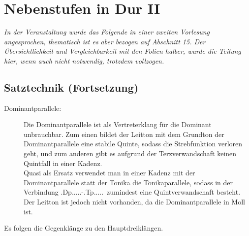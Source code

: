 \documentclass[a4paper]{article}
\newcommand{\Tp}{\HH.Tp.....}
\newcommand{\Dp}{\HH.Dp.....}
\begin{document}
	\section{Nebenstufen in Dur II}
	\textit{In der Veranstaltung wurde das Folgende in einer zweiten Vorlesung angesprochen, thematisch ist es aber bezogen auf Abschnitt 15. Der Übersichtlichkeit und Vergleichbarkeit mit den Folien halber, wurde die Teilung hier, wenn auch nicht notwendig, trotzdem vollzogen.}
	\subsection{Satztechnik  (Fortsetzung)}
	\begin{description}
		\item[Dominantparallele:] Die Dominantparallele ist als Vertreterklang für die Dominant unbrauchbar. Zum einen bildet der Leitton mit dem Grundton der Dominantparallele eine stabile Quinte, sodass die Strebfunktion verloren geht, und zum anderen gibt es aufgrund der Terzverwandschaft keinen Quintfall in einer Kadenz.\\
		Quasi als Ersatz verwendet man in einer Kadenz mit der Dominantparallele statt der Tonika die Tonikaparallele, sodass in der Verbindung \Dp-\Tp\ zumindest eine Quintverwandschaft besteht. Der Leitton ist jedoch nicht vorhanden, da die Dominantparallele in Moll ist.
	\end{description}
	Es folgen die Gegenklänge zu den Hauptdreiklängen.
\end{document}
